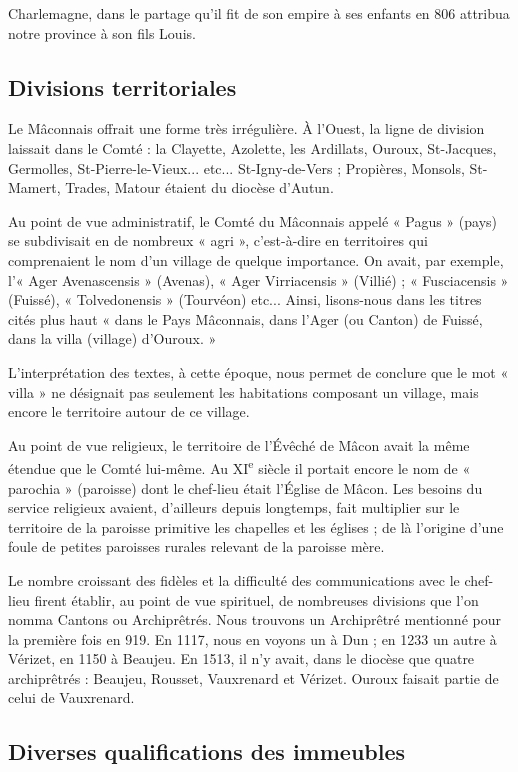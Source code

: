 \documentclass[11pt,a4paper]{report}
\begin{document}
Charlemagne, dans le partage qu'il fit de son empire à ses enfants en 806
attribua notre province à son fils Louis.

\subsection*{Divisions territoriales}

Le Mâconnais offrait une forme très irrégulière. À l'Ouest, la ligne de
division laissait dans le Comté : la Clayette, Azolette, les Ardillats, Ouroux,
St-Jacques, Germolles, St-Pierre-le-Vieux... etc... St-Igny-de-Vers ; Propières,
Monsols, St-Mamert, Trades, Matour étaient du diocèse d'Autun.

Au point de vue administratif, le Comté du Mâconnais appelé « Pagus » (pays) se
subdivisait en de nombreux « agri », c'est-à-dire en territoires qui comprenaient
le nom d'un village de quelque importance. On avait, par exemple, l'« Ager
Avenascensis » (Avenas), « Ager Virriacensis » (Villié) ; « Fusciacensis »
(Fuissé), « Tolvedonensis » (Tourvéon) etc... Ainsi, lisons-nous dans les titres
cités plus haut « dans le Pays Mâconnais, dans l'Ager (ou Canton) de Fuissé, dans
la villa (village) d'Ouroux. »

L'interprétation des textes, à cette époque, nous permet de conclure que le mot
« villa » ne désignait pas seulement les habitations composant un village, mais
encore le territoire autour de ce village.

Au point de vue religieux, le territoire de l'Évêché de Mâcon avait la même
étendue que le Comté lui-même. Au XI\textsuperscript{e} siècle il portait encore
le nom de « parochia » (paroisse) dont le chef-lieu était l'Église de Mâcon. Les
besoins du service religieux avaient, d'ailleurs depuis longtemps, fait multiplier
sur le territoire de la paroisse primitive les chapelles et les églises ; de là
l'origine d'une foule de petites paroisses rurales relevant de la paroisse mère.

Le nombre croissant des fidèles et la difficulté des communications avec le
chef-lieu firent établir, au point de vue spirituel, de nombreuses divisions que
l'on nomma Cantons ou Archiprêtrés. Nous trouvons un Archiprêtré mentionné pour
la première fois en 919. En 1117, nous en voyons un à Dun ; en 1233 un autre à
Vérizet, en 1150 à Beaujeu. En 1513, il n'y avait, dans le diocèse que quatre
archiprêtrés : Beaujeu, Rousset, Vauxrenard et Vérizet. Ouroux faisait partie de
celui de Vauxrenard.

\subsection*{Diverses qualifications des immeubles}
\end{document}
